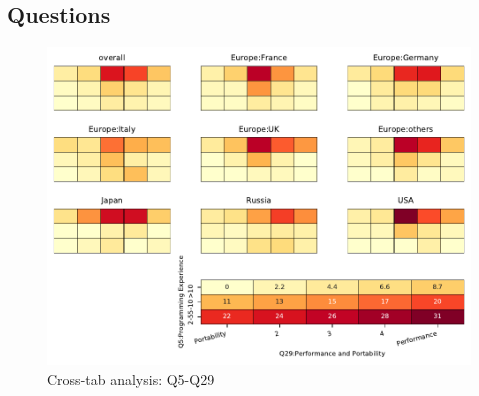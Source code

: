 
\subsection{Questions}


\begin{figure}
\begin{center}
\includegraphics[width=12cm]{../pdfs/Q5-Q29.pdf}
\caption{Cross-tab analysis: Q5-Q29}
\label{fig:Q5-Q29}
\end{center}
\end{figure}
